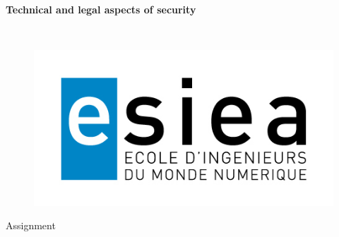\begin{titlepage}
      \begin{center}   
        \Huge
        \textbf{Technical and legal aspects of security}
        
        \LARGE
        ~
        
        
        \vfill
        \begin{figure}[H]
	    \centering
	    \begin{minipage}{0.9\textwidth}
		\centering
		\includegraphics[width=\textwidth]{./img/esiea.jpeg}
	    \end{minipage}\hfill
	\end{figure}
        \vfill
        
        \vspace{0.5cm}
        
        Assignment


\end{center}
\end{titlepage}
